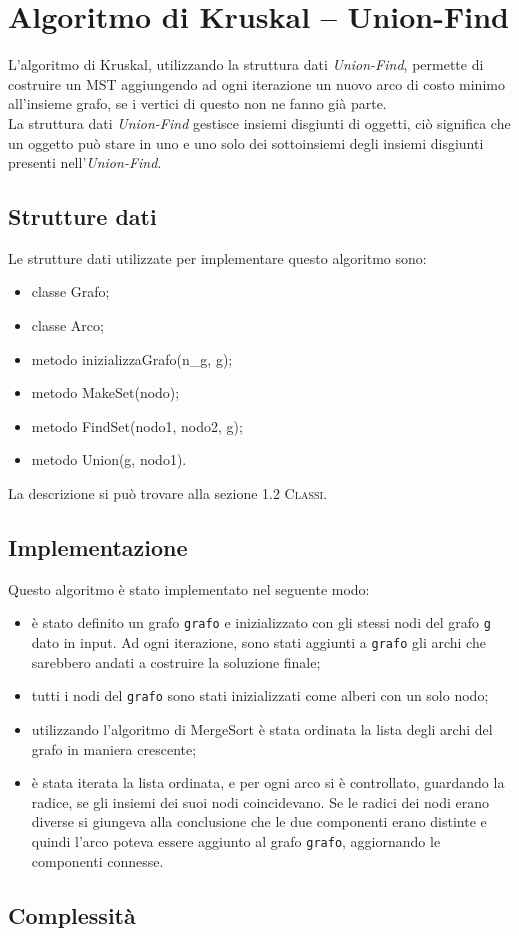 \section{Algoritmo di Kruskal -- Union-Find}
\label{Algoritmo_di_Kruskal_Union-Find}

L'algoritmo di Kruskal, utilizzando la struttura dati \textit{Union-Find}, permette di costruire un MST aggiungendo ad ogni iterazione un nuovo arco di costo minimo all'insieme grafo, se i vertici di questo non ne fanno già parte. \\
La struttura dati \textit{Union-Find} gestisce insiemi disgiunti di oggetti, ciò significa che un oggetto può stare in uno e uno solo dei sottoinsiemi degli insiemi disgiunti presenti nell'\textit{Union-Find}.

\subsection{Strutture dati}
\label{strutture_dati}

Le strutture dati utilizzate per implementare questo algoritmo sono:

\begin{itemize}
    \item classe Grafo;
    \item classe Arco;
    \item metodo inizializzaGrafo(n\_g, g);
    \item metodo MakeSet(nodo);
    \item metodo FindSet(nodo1, nodo2, g);
    \item metodo Union(g, nodo1).
\end{itemize}

La descrizione si può trovare alla sezione \textsc{1.2 Classi}.

\subsection{Implementazione}
\label{implementazione}

Questo algoritmo è stato implementato nel seguente modo:

\begin{itemize}
    \item è stato definito un grafo \texttt{grafo} e inizializzato con gli stessi nodi del grafo \texttt{g} dato in input. Ad ogni iterazione, sono stati aggiunti a \texttt{grafo} gli archi che sarebbero andati a costruire la soluzione finale;
    \item tutti i nodi del \texttt{grafo} sono stati inizializzati come alberi con un solo nodo;
    \item utilizzando l'algoritmo di MergeSort è stata ordinata la lista degli archi del grafo in maniera crescente;
    \item è stata iterata la lista ordinata, e per ogni arco si è controllato, guardando la radice, se gli insiemi dei suoi nodi coincidevano. Se le radici dei nodi erano diverse si giungeva alla conclusione che le due componenti erano distinte e quindi l'arco poteva essere aggiunto al grafo \texttt{grafo}, aggiornando le componenti connesse.
\end{itemize}


\subsection{Complessità}
\label{complessità}